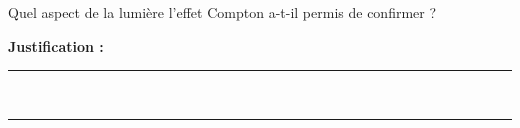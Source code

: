 Quel aspect de la lumière l'effet Compton a-t-il permis de confirmer ?

\choices

\noindent\textbf{Justification :} \hrulefill \\[2.5ex]
\rule{\linewidth}{0.4pt} \\[2.5ex]
\rule{\linewidth}{0.4pt}
\vfill
